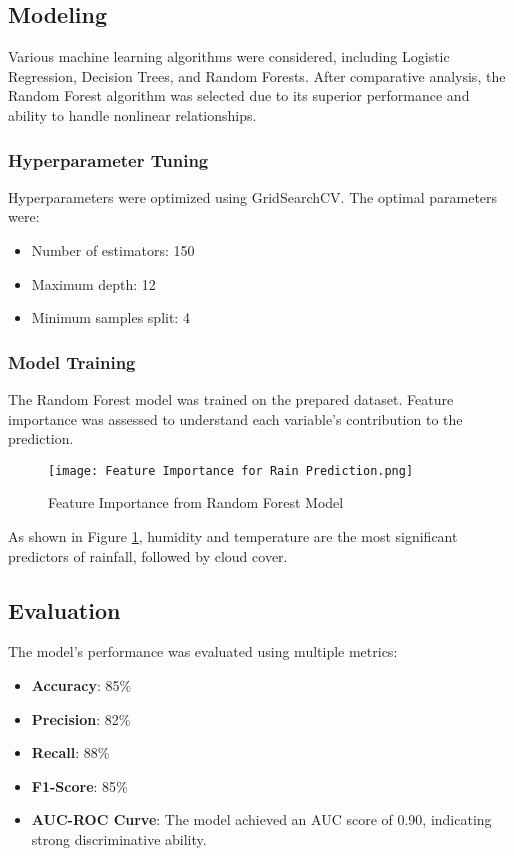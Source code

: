 \documentclass[12pt]{article}
\begin{document}
\subsection{Modeling}
Various machine learning algorithms were considered, including Logistic Regression, Decision Trees, and Random Forests. After comparative analysis, the Random Forest algorithm was selected due to its superior performance and ability to handle nonlinear relationships.

\subsubsection{Hyperparameter Tuning}
Hyperparameters were optimized using GridSearchCV. The optimal parameters were:

\begin{itemize}
    \item Number of estimators: 150
    \item Maximum depth: 12
    \item Minimum samples split: 4
\end{itemize}

\subsubsection{Model Training}
The Random Forest model was trained on the prepared dataset. Feature importance was assessed to understand each variable's contribution to the prediction.

\begin{figure}[H]
    \centering
    \texttt{[image: Feature Importance for Rain Prediction.png]}
    \caption{Feature Importance from Random Forest Model}
    \label{fig:feature_importance}
\end{figure}

As shown in Figure \ref{fig:feature_importance}, humidity and temperature are the most significant predictors of rainfall, followed by cloud cover.

\subsection{Evaluation}
The model's performance was evaluated using multiple metrics:

\begin{itemize}
    \item \textbf{Accuracy}: 85\%
    \item \textbf{Precision}: 82\%
    \item \textbf{Recall}: 88\%
    \item \textbf{F1-Score}: 85\%
    \item \textbf{AUC-ROC Curve}: The model achieved an AUC score of 0.90, indicating strong discriminative ability.
\end{itemize}
\end{document}
